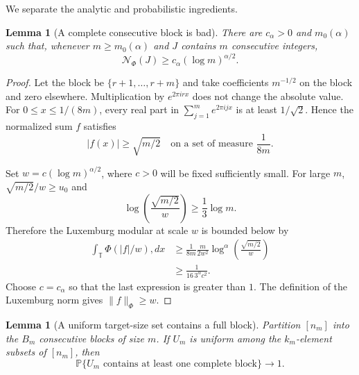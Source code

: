 \documentclass[11pt]{article}
\newtheorem{lemma}[theorem]{Lemma}
\newcommand{\T}{\mathbb T}
\newcommand{\Pp}{\mathbb P}
\begin{document}
We separate the analytic and probabilistic ingredients.

\begin{lemma}[A complete consecutive block is bad]\label{lem:dirichlet}
There are $c_\alpha>0$ and $m_0(\alpha)$ such that, whenever
$m\ge m_0(\alpha)$ and $J$ contains $m$ consecutive integers,
\[
 \mathcal N_\Phi(J)\ge c_\alpha(\log m)^{\alpha/2}.
\]
\end{lemma}

\begin{proof}
Let the block be $\{r+1,\ldots,r+m\}$ and take coefficients $m^{-1/2}$
on the block and zero elsewhere.  Multiplication by $e^{2\pi irx}$ does not
change the absolute value.  For $0\le x\le1/(8m)$, every real part in
$\sum_{j=1}^m e^{2\pi ijx}$ is at least $1/\sqrt2$.  Hence the normalized
sum $f$ satisfies
\[
 |f(x)|\ge\sqrt{m/2}
 \quad\text{on a set of measure }\frac1{8m}.
\]

Set $w=c(\log m)^{\alpha/2}$, where $c>0$ will be fixed sufficiently small.
For large $m$, $\sqrt{m/2}/w\ge u_0$ and
\[
 \log\left(\frac{\sqrt{m/2}}w\right)\ge\frac13\log m.
\]
Therefore the Luxemburg modular at scale $w$ is bounded below by
\begin{align*}
 \int_\T \Phi(|f|/w),dx
 &\ge \frac1{8m}\frac{m}{2w^2}
 \log^\alpha\left(\frac{\sqrt{m/2}}w\right)\\
 &\ge \frac{1}{16\,3^\alpha c^2}.
\end{align*}
Choose $c=c_\alpha$ so that the last expression is greater than $1$.
The definition of the Luxemburg norm gives $\|f\|_\Phi\ge w$.
\end{proof}

\begin{lemma}[A uniform target-size set contains a full block]\label{lem:block}
Partition $[n_m]$ into the $B_m$ consecutive blocks of size $m$.  If
$U_m$ is uniform among the $k_m$-element subsets of $[n_m]$, then
\[
 \Pp\{U_m\text{ contains at least one complete block}\}\longrightarrow1.
\]
\end{lemma}
\end{document}
